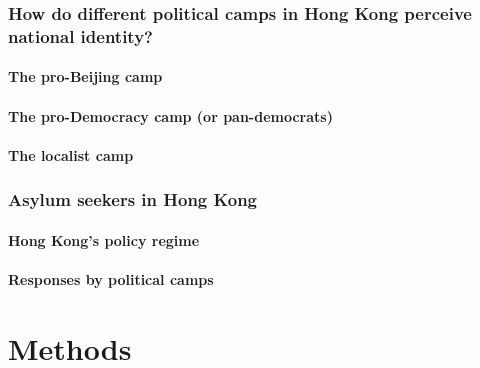 \documentclass[a4paper, oneside]{report}
\begin{document}
\hypertarget{how-do-different-political-camps-in-hong-kong-perceive-national-identity}{%
\subsection{How do different political camps in Hong Kong perceive
national
identity?}\label{how-do-different-political-camps-in-hong-kong-perceive-national-identity}}

\hypertarget{the-pro-beijing-camp}{%
\subsubsection{The pro-Beijing camp}\label{the-pro-beijing-camp}}

\hypertarget{the-pro-democracy-camp-or-pan-democrats}{%
\subsubsection{The pro-Democracy camp (or
pan-democrats)}\label{the-pro-democracy-camp-or-pan-democrats}}

\hypertarget{the-localist-camp}{%
\subsubsection{The localist camp}\label{the-localist-camp}}

\hypertarget{asylum-seekers-in-hong-kong}{%
\subsection{Asylum seekers in Hong
Kong}\label{asylum-seekers-in-hong-kong}}

\hypertarget{hong-kongs-policy-regime}{%
\subsubsection{Hong Kong's policy
regime}\label{hong-kongs-policy-regime}}

\hypertarget{responses-by-political-camps}{%
\subsubsection{Responses by political
camps}\label{responses-by-political-camps}}

\setcounter{chapter}{2}

\hypertarget{methods}{%
\chapter{Methods}\label{methods}}
\end{document}
